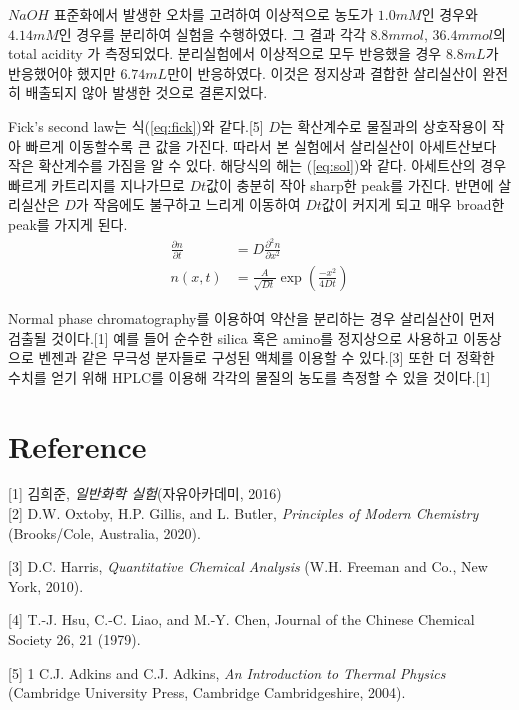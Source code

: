 \documentclass[%
 reprint,
 amsmath,amssymb,
 aps,
]{revtex4-2}
\begin{document}
$NaOH$ 표준화에서 발생한 오차를 고려하여 이상적으로 농도가 $1.0mM$인 경우와 $4.14mM$인 경우를 분리하여 실험을 수행하였다. 그 결과 각각 $8.8mmol$, $36.4mmol$의 total acidity 가 측정되었다. 분리실험에서 이상적으로 모두 반응했을 경우 $8.8mL$가 반응했어야 했지만 $6.74mL$만이 반응하였다. 이것은 정지상과 결합한 살리실산이 완전히 배출되지 않아 발생한 것으로 결론지었다.

Fick's second law는 식(\ref{eq:fick})와 같다.[5] $D$는 확산계수로 물질과의 상호작용이 작아 빠르게 이동할수록 큰 값을 가진다. 따라서 본 실험에서 살리실산이 아세트산보다 작은 확산계수를 가짐을 알 수 있다. 해당식의 해는 (\ref{eq:sol})와 같다. 아세트산의 경우 빠르게 카트리지를 지나가므로 $Dt$값이 충분히 작아 sharp한 peak를 가진다. 반면에 살리실산은 $D$가 작음에도 불구하고 느리게 이동하여 $Dt$값이 커지게 되고 매우 broad한 peak를 가지게 된다.
\begin{align} 
	\frac{\partial n}{\partial t} &= D\frac{\partial^{2} n}{\partial x^{2}}\label{eq:fick}\\
	n(x,t) &= \frac{A}{\sqrt{Dt}}\exp\left(\frac{-x^{2}}{4Dt}\right)\label{eq:sol}
\end{align}

Normal phase chromatography를 이용하여 약산을 분리하는 경우 살리실산이 먼저 검출될 것이다.[1] 예를 들어 순수한 silica 혹은 amino를 정지상으로 사용하고 이동상으로 벤젠과 같은 무극성 분자들로 구성된 액체를 이용할 수 있다.[3] 또한 더 정확한 수치를 얻기 위해 HPLC를 이용해 각각의 물질의 농도를 측정할 수 있을 것이다.[1]



\section{\label{sec:level1}Reference}
[1] 김희준, \textit{일반화학 실험}(자유아카데미, 2016)\\

[2] D.W. Oxtoby, H.P. Gillis, and L. Butler, \textit{Principles of Modern Chemistry} (Brooks/Cole, Australia, 2020).

[3] D.C. Harris, \textit{Quantitative Chemical Analysis} (W.H. Freeman and Co., New York, 2010). 

[4] T.-J. Hsu, C.-C. Liao, and M.-Y. Chen, Journal of the Chinese Chemical Society 26, 21 (1979). 

[5] 1 C.J. Adkins and C.J. Adkins, \textit{An Introduction to Thermal Physics} (Cambridge University Press, Cambridge Cambridgeshire, 2004). 
\end{document}
